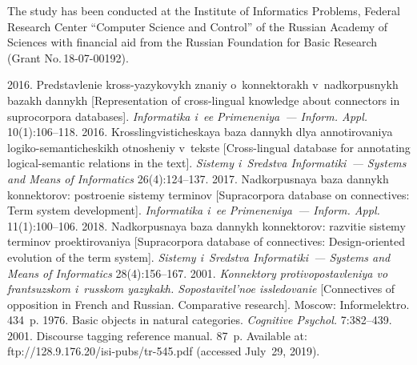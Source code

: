    
   
   


\Ack
   \noindent
   The study has been conducted at the Institute of Informatics Problems, Federal Research 
Center ``Computer Science and Control'' of the Russian Academy of Sciences  
with financial aid from the Russian Foundation for Basic Research (Grant No.\,18-07-00192).



  \begin{multicols}{2}

\renewcommand{\bibname}{\protect\rmfamily References}

{\small\frenchspacing
 {%
 \begin{thebibliography}{99}
2016. Predstavlenie kross-yazykovykh znaniy o~konnektorakh v~nadkorpusnykh 
bazakh dannykh [Representation of cross-lingual knowledge about connectors in 
suprocorpora databases]. \textit{Informatika i~ee Primeneniya~--- Inform. Appl.} 
10(1):106--118.
 2016.  
Krosslingvisticheskaya baza dannykh dlya annotirovaniya logiko-semanticheskikh 
otnosheniy v~tekste [Cross-lingual database for annotating logical-semantic 
relations in the text]. \textit{Sistemy i~Sredstva Informatiki~--- Systems and Means 
of Informatics} 26(4):124--137.
 2017. 
Nadkorpusnaya baza dannykh konnektorov: postroenie sistemy terminov 
[Supracorpora database on connectives: Term system development]. 
\textit{Informatika i~ee Primeneniya~--- Inform. Appl.} 11(1):100--106.
 2018. Nadkorpusnaya baza dannykh 
konnektorov: razvitie sistemy terminov proektirovaniya [Supracorpora database of 
connectives: Design-oriented evolution of the term system]. \textit{Sistemy 
i~Sredstva Informatiki~--- Systems and Means of Informatics} 28(4):156--167.
 2001. \textit{Konnektory protivopostavleniya vo 
frantsuzskom i~russkom yazykakh. Sopostavitel'noe issledovanie} [Connectives of 
opposition in French and Russian. Comparative research]. Moscow: 
Informelektro. 434~p. 
 1976. Basic objects in natural categories. \textit{Cognitive 
Psychol.} 7:382--439.
 2001. Discourse tagging reference manual. 87~p.
Available at: {\sf ftp://128.9.176.20/isi-pubs/tr-545.pdf}
(accessed July~29, 2019). 


\end{thebibliography}}}
\end{multicols}
